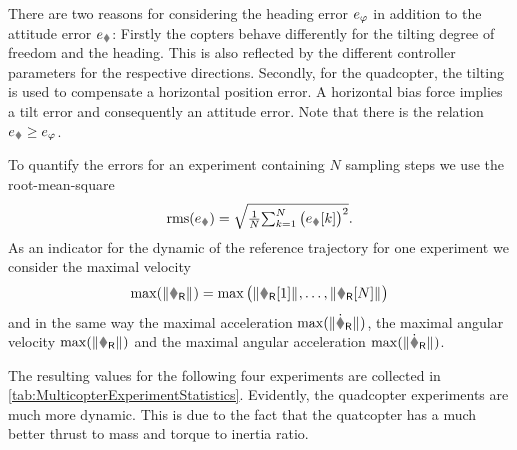 There are two reasons for considering the heading error $e_{\varphi}$ in addition to the attitude error $e_{\R}$:
Firstly the copters behave differently for the tilting degree of freedom and the heading.
This is also reflected by the different controller parameters for the respective directions.
Secondly, for the quadcopter, the tilting is used to compensate a horizontal position error.
A horizontal bias force implies a tilt error and consequently an attitude error.
Note that there is the relation $e_{\R} \geq e_{\head}$.

To quantify the errors for an experiment containing $N$ sampling steps we use the root-mean-square
\begin{align}
 \RMS(e_{\r}) = \sqrt{ \tfrac{1}{N} \textstyle{\sum_{k=1}^{N} \big( e_{\r}[k] \big)^2} }.
\end{align}
As an indicator for the dynamic of the reference trajectory for one experiment we consider the maximal velocity
\begin{align}
 \max(\norm{\vR}) = \max\big( \norm{\vR[1]}, \ldots, \norm{\vR[N]} \big)
\end{align}
and in the same way the maximal acceleration $\max(\norm{\vRd})$, the maximal angular velocity $\max(\norm{\wR})$ and the maximal angular acceleration $\max(\norm{\wRd})$.

The resulting values for the following four experiments are collected in \autoref{tab:MulticopterExperimentStatistics}.
Evidently, the quadcopter experiments are much more dynamic.
This is due to the fact that the quatcopter has a much better thrust to mass and torque to inertia ratio.

